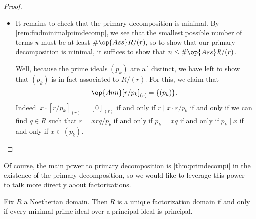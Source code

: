 \begin{proof}
\begin{itemize}
		\item It remains to check that the primary decomposition is minimal. By \autoref{rem:findminimalprimdecomp}, we see that the smallest possible number of terms $n$ must be at least $\#\op{Ass}R/(r)$, so to show that our primary decomposition is minimal, it suffices to show that $n\le\#\op{Ass}R/(r)$.

		Well, because the prime ideals $(p_k)$ are all distinct, we have left to show that $(p_k)$ is in fact associated to $R/(r)$. For this, we claim that
		\[\op{Ann}[r/p_k]_{(r)}=\{(p_k)\}.\]
		Indeed, $x\cdot[r/p_k]_{(r)}=[0]_{(r)}$ if and only if $r\mid x\cdot r/p_k$ if and only if we can find $q\in R$ such that $r=xrq/p_k$ if and only if $p_k=xq$ if and only if $p_k\mid x$ if and only if $x\in(p_k)$.
		\qedhere
	\end{itemize}
\end{proof}
Of course, the main power to primary decomposition is \autoref{thm:primdecompi} in the existence of the primary decomposition, so we would like to leverage this power to talk more directly about factorizations.
\begin{proposition} \label{prop:equivufd}
	Fix $R$ a Noetherian domain. Then $R$ is a unique factorization domain if and only if every minimal prime ideal over a principal ideal is principal.
\end{proposition}
